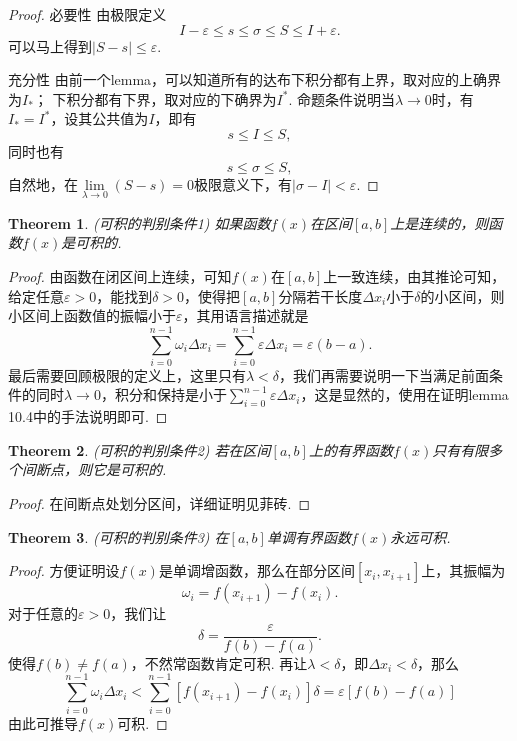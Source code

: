 \documentclass{article}
\newtheorem{theorem}{Theorem}[section]
\begin{document}
\begin{proof}
{\color{blue} 必要性} 由极限定义
$$
I-\varepsilon \leq s \leq \sigma \leq S \leq I+\varepsilon.
$$
可以马上得到$|S-s| \leq \varepsilon$.

{\color{blue} 充分性} 由前一个lemma，可以知道所有的达布下积分都有上界，取对应的上确界为$I_*$； 下积分都有下界，取对应的下确界为$I^*$. 命题条件说明当$\lambda \rightarrow 0$时，有$I_* = I^*$，设其公共值为$I$，即有
$$
s \leq I \leq S,
$$
同时也有
$$
s \leq \sigma \leq S,
$$
自然地，在$\lim\limits_{\lambda \rightarrow 0} (S-s) = 0$极限意义下，有$|\sigma -I| < \varepsilon$.
\end{proof}


\begin{theorem}
\rm {\color{red} (可积的判别条件1) }如果函数$f(x)$在区间$[a,b]$上是连续的，则函数$f(x)$是可积的.
\end{theorem}

\begin{proof}
由函数在闭区间上连续，可知$f(x)$在$[a,b]$上一致连续，由其推论可知，给定任意$\varepsilon > 0$，能找到$\delta > 0$，使得把$[a,b]$分隔若干长度$\Delta x_i$小于$\delta$的小区间，则小区间上函数值的振幅小于$\varepsilon$，其用语言描述就是
$$
\sum\limits_{i=0}^{n-1} \omega_i \Delta x_i =  \sum\limits_{i=0}^{n-1} \varepsilon \Delta x_i = \varepsilon(b-a).
$$
最后需要回顾极限的定义上，这里只有$\lambda < \delta$，我们再需要说明一下当满足前面条件的同时$\lambda \rightarrow 0$，积分和保持是小于$\sum\limits_{i=0}^{n-1} \varepsilon \Delta x_i$，这是显然的，使用在证明lemma 10.4中的手法说明即可.
\end{proof}

\begin{theorem}
\rm {\color{red} (可积的判别条件2) } 若在区间$[a,b]$上的有界函数$f(x)$只有有限多个间断点，则它是可积的.
\end{theorem}

\begin{proof}
在间断点处划分区间，详细证明见菲砖.
\end{proof}

\begin{theorem}
\rm {\color{red} (可积的判别条件3) } 在$[a,b]$单调有界函数$f(x)$永远可积.
\end{theorem}

\begin{proof}
方便证明设$f(x)$是单调增函数，那么在部分区间$[x_i,x_{i+1}]$上，其振幅为
$$
\omega_i = f(x_{i+1})-f(x_{i}).
$$
对于任意的$\varepsilon > 0$，我们让
$$
\delta = \frac{\varepsilon}{f(b)-f(a)}.
$$
使得$f(b)\neq f(a)$，不然常函数肯定可积. 再让$\lambda < \delta$，即$\Delta x_i < \delta$，那么
$$
\sum\limits_{i=0}^{n-1}\omega_i\Delta x_i < \sum\limits_{i=0}^{n-1}\left[f(x_{i+1})-f(x_{i})\right] \delta = \varepsilon\left[ f(b)-f(a) \right] 
$$
由此可推导$f(x)$可积.
\end{proof}
\end{document}
